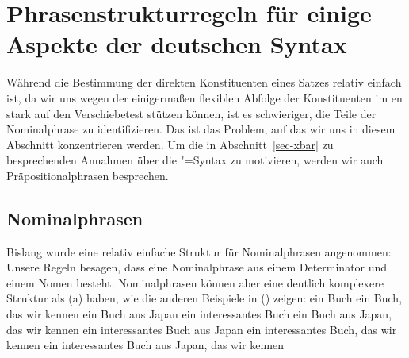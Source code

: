 

\section{Phrasenstrukturregeln für einige Aspekte der deutschen Syntax}

Während die Bestimmung der direkten Konstituenten eines Satzes relativ einfach ist, da wir uns wegen der
einigermaßen flexiblen Abfolge der Konstituenten im en stark auf den Verschiebetest stützen können, ist es schwieriger, die Teile der Nominalphrase zu identifizieren. Das ist das Problem,
auf das wir uns in diesem Abschnitt konzentrieren werden. Um die in Abschnitt~\ref{sec-xbar} zu besprechenden Annahmen über die \xbar"=Syntax zu motivieren,
werden wir auch Präpositionalphrasen besprechen.


\subsection{Nominalphrasen}
\label{sec-psg-np}

Bislang wurde eine relativ einfache Struktur für Nominalphrasen angenommen: Unsere Regeln besagen, dass eine Nominalphrase aus einem Determinator und einem
Nomen besteht. Nominalphrasen können aber eine deutlich komplexere Struktur als (a) haben,
wie die anderen Beispiele in () zeigen:
\eal
\label{Beispiele-NP-Adjunkte}
\ex
ein Buch
\ex
\label{ex-ein-Buch-das-wir-kennen}
ein Buch, das wir kennen
\ex
\label{ex-ein-Buch-aus-Japan}
ein Buch aus Japan
\ex
ein interessantes Buch
\ex
ein Buch aus Japan, das wir kennen
\ex
ein interessantes Buch aus Japan
\ex
ein interessantes Buch, das wir kennen
\ex
ein interessantes Buch aus Japan, das wir kennen
\zl

